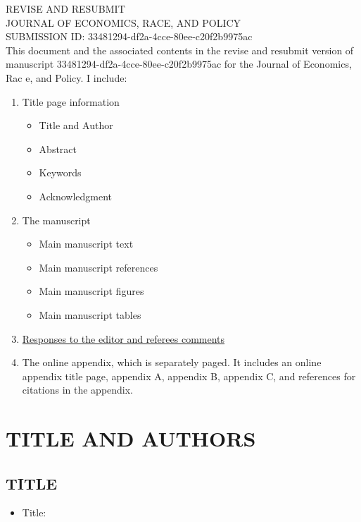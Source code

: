 \documentclass[12pt,english]{article}
\begin{document}
\thispagestyle{empty}
\begingroup
  \doublespacing
  \centering
  \LARGE REVISE AND RESUBMIT\\[0.25em]
  \LARGE JOURNAL OF ECONOMICS, RACE, AND POLICY \\[0.25em]
  \LARGE SUBMISSION ID: 33481294-df2a-4cce-80ee-c20f2b9975ac \\[1.0em]
\endgroup
This document and the associated contents in the revise and resubmit version of manuscript 33481294-df2a-4cce-80ee-c20f2b9975ac for the Journal of Economics, Rac
e, and Policy. I include:
\begin{enumerate}
    \item Title page information
    \begin{itemize}
        \item Title and Author
        \item Abstract
        \item Keywords
        \item Acknowledgment
    \end{itemize}
    \item The manuscript
    \begin{itemize}
        \item Main manuscript text
        \item Main manuscript references
        \item Main manuscript figures
        \item Main manuscript tables
    \end{itemize}  
    \item \hyperref[r&r:responses]{Responses to the editor and referees comments}
    \item The online appendix, which is separately paged. It includes an online appendix title page, appendix A, appendix B, appendix C, and references for citations in the appendix.
\end{enumerate}
\clearpage


\setcounter{page}{1}

\section*{TITLE AND AUTHORS}
\subsection*{TITLE}
\begin{itemize}[label={}, leftmargin=*]
    \item Title: \textbf{\PAPERTITLE}
\end{itemize}
\end{document}
